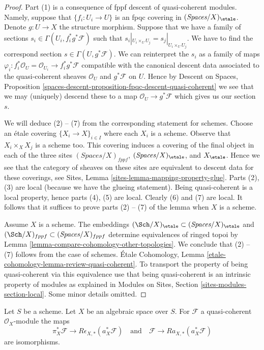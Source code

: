 \begin{proof}
Part (1) is a consequence of fppf descent of quasi-coherent modules.
Namely, suppose that $\{f_i : U_i \to U\}$ is an fpqc covering
in $(\textit{Spaces}/X)_\etale$. Denote $g : U \to X$ the structure
morphism. Suppose that
we have a family of sections $s_i \in \Gamma(U_i , f_i^*g^*\mathcal{F})$
such that $s_i|_{U_i \times_U U_j} = s_j|_{U_i \times_U U_j}$.
We have to find the correspond section $s \in \Gamma(U, g^*\mathcal{F})$.
We can reinterpret the $s_i$ as a family of maps
$\varphi_i : f_i^*\mathcal{O}_U = \mathcal{O}_{U_i} \to f_i^*g^*\mathcal{F}$
compatible with the canonical descent data associated to the
quasi-coherent sheaves $\mathcal{O}_U$ and $g^*\mathcal{F}$ on $U$.
Hence by Descent on Spaces, Proposition
\ref{spaces-descent-proposition-fpqc-descent-quasi-coherent}
we see that we may (uniquely) descend
these to a map $\mathcal{O}_U \to g^*\mathcal{F}$ which gives
us our section $s$.

\medskip\noindent
We will deduce (2) -- (7) from the corresponding statement for schemes.
Choose an \'etale covering $\{X_i \to X\}_{i \in I}$
where each $X_i$ is a scheme. Observe that $X_i \times_X X_j$
is a scheme too. This covering induces a covering of
the final object in each of the three sites
$(\textit{Spaces}/X)_{fppf}$, $(\textit{Spaces}/X)_\etale$, and $X_\etale$.
Hence we see that the category of sheaves on these sites
are equivalent to descent data for these coverings, see
Sites, Lemma \ref{sites-lemma-mapping-property-glue}.
Parts (2), (3) are local (because we have the glueing statement).
Being quasi-coherent is a local property, hence parts
(4), (5) are local. Clearly (6) and (7) are local.
It follows that it suffices to prove parts (2) -- (7)
of the lemma when $X$ is a scheme.

\medskip\noindent
Assume $X$ is a scheme. The embeddings
$(\Sch/X)_\etale \subset (\textit{Spaces}/X)_\etale$ and
$(\Sch/X)_{fppf} \subset (\textit{Spaces}/X)_{fppf}$
determine equivalences of ringed topoi by
Lemma \ref{lemma-compare-cohomology-other-topologies}.
We conclude that (2) -- (7) follows from the case of schemes.
\'Etale Cohomology, Lemma
\ref{etale-cohomology-lemma-review-quasi-coherent}.
To transport the property of being quasi-coherent via
this equivalence use that being quasi-coherent is an
intrinsic property of modules as explained in
Modules on Sites, Section \ref{sites-modules-section-local}.
Some minor details omitted.
\end{proof}

\begin{lemma}
\label{lemma-cohomological-descent-etale-fppf-modules}
Let $S$ be a scheme. Let $X$ be an algebraic space over $S$.
For $\mathcal{F}$ a quasi-coherent $\mathcal{O}_X$-module the maps
$$
\pi_X^*\mathcal{F} \longrightarrow R\epsilon_{X, *}(a_X^*\mathcal{F})
\quad\text{and}\quad
\mathcal{F} \longrightarrow Ra_{X, *}(a_X^*\mathcal{F})
$$
are isomorphisms.
\end{lemma}

